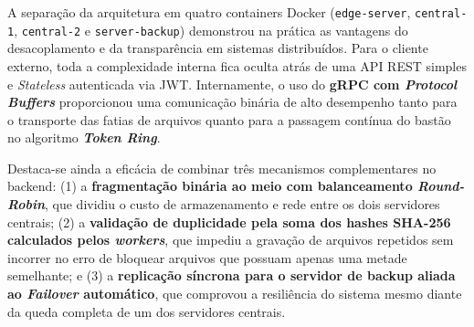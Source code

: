 \documentclass[12pt]{article}
\begin{document}
A separação da arquitetura em quatro containers Docker (\texttt{edge-server}, \texttt{central-1}, \texttt{central-2} e \texttt{server-backup}) demonstrou na prática as vantagens do desacoplamento e da transparência em sistemas distribuídos. Para o cliente externo, toda a complexidade interna fica oculta atrás de uma API REST simples e \textit{Stateless} autenticada via JWT. Internamente, o uso do \textbf{gRPC com \textit{Protocol Buffers}} proporcionou uma comunicação binária de alto desempenho tanto para o transporte das fatias de arquivos quanto para a passagem contínua do bastão no algoritmo \textbf{\textit{Token Ring}}.

Destaca-se ainda a eficácia de combinar três mecanismos complementares no backend: (1) a \textbf{fragmentação binária ao meio com balanceamento \textit{Round-Robin}}, que dividiu o custo de armazenamento e rede entre os dois servidores centrais; (2) a \textbf{validação de duplicidade pela soma dos hashes SHA-256 calculados pelos \textit{workers}}, que impediu a gravação de arquivos repetidos sem incorrer no erro de bloquear arquivos que possuam apenas uma metade semelhante; e (3) a \textbf{replicação síncrona para o servidor de backup aliada ao \textit{Failover} automático}, que comprovou a resiliência do sistema mesmo diante da queda completa de um dos servidores centrais.
\end{document}
